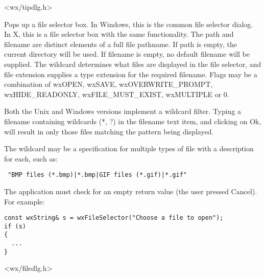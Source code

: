 


<wx/tipdlg.h>

\label{wxfileselector}


Pops up a file selector box. In Windows, this is the common file selector
dialog. In X, this is a file selector box with the same functionality.
The path and filename are distinct elements of a full file pathname.
If path is empty, the current directory will be used. If filename is empty,
no default filename will be supplied. The wildcard determines what files
are displayed in the file selector, and file extension supplies a type
extension for the required filename. Flags may be a combination of wxOPEN,
wxSAVE, wxOVERWRITE\_PROMPT, wxHIDE\_READONLY, wxFILE\_MUST\_EXIST, wxMULTIPLE or 0.

Both the Unix and Windows versions implement a wildcard filter. Typing a
filename containing wildcards (*, ?) in the filename text item, and
clicking on Ok, will result in only those files matching the pattern being
displayed.

The wildcard may be a specification for multiple types of file
with a description for each, such as:

\begin{verbatim}
 "BMP files (*.bmp)|*.bmp|GIF files (*.gif)|*.gif"
\end{verbatim}

The application must check for an empty return value (the user pressed
Cancel). For example:

\begin{verbatim}
const wxString& s = wxFileSelector("Choose a file to open");
if (s)
{
  ...
}
\end{verbatim}


<wx/filedlg.h>

